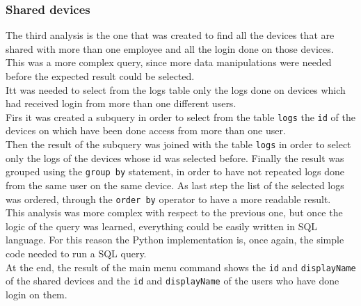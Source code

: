 \documentclass[12pt, a4paper, oneside]{article}
\begin{document}
\subsubsection{Shared devices}
The third analysis is the one that was created to find all the devices that are shared with more than one employee and all the login done on those devices.\\
This was a more complex query, since more data manipulations were needed before the expected result could be selected.\\
Itt was needed to select from the logs table only the logs done on devices which had received login from more than one different users.\\
Firs it was created a subquery in order to select from the table \texttt{logs} the \texttt{id} of the devices on which have been done access from more than one user.\\ 
Then the result of the subquery was joined with the table \texttt{logs} in order to select only the logs of the devices whose id was selected before. Finally the result was grouped using the \texttt{group by}
statement, in order to have not repeated logs done from the same user on the same device. As last step the list of the selected logs was ordered, through the \texttt{order by} operator to have a more 
readable result.\\  
This analysis was more complex with respect to the previous one, but once the logic of the query was learned, everything could be easily written in SQL language.
For this reason the Python implementation is, once again, the simple code needed to run a SQL query.\\
At the end, the result of the main menu command shows the \texttt{id} and \texttt{displayName} of the shared devices and the \texttt{id} and \texttt{displayName} of the users who have done login on them.
\end{document}
